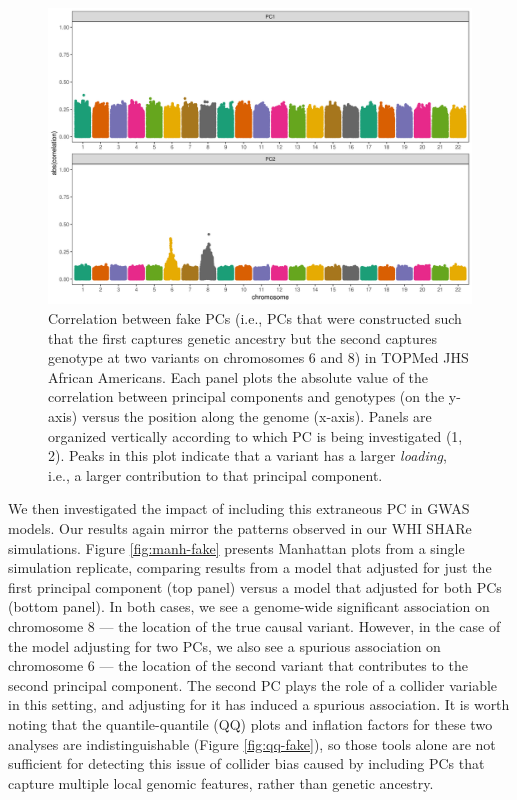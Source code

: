 \documentclass[12pt]{article}
\begin{document}
\begin{figure}[!htb]
\centering
\includegraphics[width=\textwidth]{figs/fakepcs/fake_pcs_corr_1}
\caption[Correlation between fake PCs and genotypes in TOPMed JHS.]{Correlation between fake PCs (i.e., PCs that were constructed such that the first captures genetic ancestry but the second captures genotype at two variants on chromosomes 6 and 8) in TOPMed JHS African Americans. Each panel plots the absolute value of the correlation between principal components and genotypes (on the y-axis) versus the position along the genome (x-axis).  Panels are organized vertically according to which PC is being investigated (1, 2). Peaks in this plot indicate that a variant has a larger \textit{loading}, i.e., a larger contribution to that principal component.}
\label{fig:corr-fake}
\end{figure}


We then investigated the impact of including this extraneous PC in GWAS models. 
Our results again mirror the patterns observed in our WHI SHARe simulations.
Figure \ref{fig:manh-fake} presents Manhattan plots from a single simulation replicate, comparing results from a model that adjusted for just the first principal component (top panel) versus a model that adjusted for both PCs (bottom panel).
In both cases, we see a genome-wide significant association on chromosome 8 --- the location of the true causal variant.
However, in the case of the model adjusting for two PCs, we also see a spurious association on chromosome 6 --- the location of the second variant that contributes to the second principal component.
The second PC plays the role of a collider variable in this setting, and adjusting for it has induced a spurious association.
It is worth noting that the quantile-quantile (QQ) plots and inflation factors for these two analyses are indistinguishable (Figure \ref{fig:qq-fake}), so those tools alone are not sufficient for detecting this issue of collider bias caused by including PCs that capture multiple local genomic features, rather than genetic ancestry.
\end{document}
